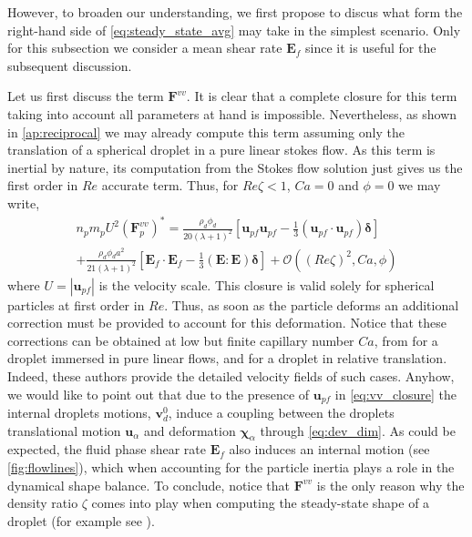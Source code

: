 However, to broaden our understanding, we first propose to discus what form the right-hand side of \ref{eq:steady_state_avg} may take in the simplest scenario. 
Only for this subsection we consider a mean shear rate $\textbf{E}_f$ since it is useful for the subsequent discussion. 

Let us first discuss the term $\textbf{F}^{vv}$. 
It is clear that a complete closure for this term taking into account all parameters at hand is impossible. 
Nevertheless, as shown in \ref{ap:reciprocal} we may already compute this term assuming only the translation of a spherical droplet in a pure linear stokes flow. 
As this term is inertial by nature, its computation from the Stokes flow solution just gives us the first order in $Re$ accurate term.
Thus, for $Re \zeta < 1$, $Ca = 0$ and $\phi = 0$ we may write,
\begin{multline}
    n_p m_p U^2 (\textbf{F}^{vv}_p)^*
    = 
    \frac{\rho_d \phi_d}{20(\lambda +1 )^2}
    \left[
        \textbf{u}_{p f}\textbf{u}_{p f} 
    -\frac{1}{3} (\textbf{u}_{p f}\cdot \textbf{u}_{p f})\bm\delta
    \right]\\
    + \frac{\rho_d \phi_d a^2}{21 (\lambda + 1)^2}[\textbf{E}_f\cdot \textbf{E}_f - \frac{1}{3}(\textbf{E}:\textbf{E})\bm\delta]
    + \mathcal{O}((Re\zeta)^2,Ca, \phi)
    \label{eq:vv_closure}
\end{multline}
where $U = |\textbf{u}_{pf}|$ is the velocity scale. 
This closure is valid solely for spherical particles at first order in $Re$. 
Thus, as soon as the particle deforms an additional correction must be provided to account for this deformation. 
Notice that these corrections can be obtained at low but finite capillary number $Ca$, from \citet{leal2007advanced} for a droplet immersed in pure linear flows, and \citet{taylor1964deformation} for a droplet in relative translation. 
Indeed, these authors provide the detailed velocity fields of such cases. 
Anyhow, we would like to point out that due to the presence of $\textbf{u}_{p f}$ in \ref{eq:vv_closure} the internal droplets motions, $\textbf{v}_d^0$, induce a coupling between the droplets translational motion $\textbf{u}_\alpha$ and deformation $\bm\chi_\alpha$ through \ref{eq:dev_dim}. 
As could be expected, the fluid phase shear rate $\textbf{E}_f$ also induces an internal motion (see \ref{fig:flowlines}), which when accounting for the particle inertia plays a role in the dynamical shape balance.  
To conclude, notice that $\textbf{F}^{vv}$ is the only reason why the density ratio $\zeta$ comes into play when computing the steady-state shape of a droplet (for example see \citet{taylor1964deformation}). 

